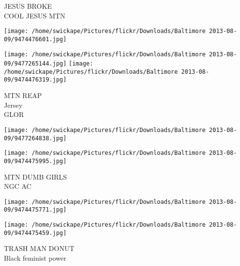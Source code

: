\documentclass[10pt,letterpaper]{article}
\begin{document}
JESUS BROKE\\
COOL JESUS MTN
\pagebreak

\texttt{[image: /home/swickape/Pictures/flickr/Downloads/Baltimore 2013-08-09/9474476601.jpg]}

\vspace{0.25in}
\texttt{[image: /home/swickape/Pictures/flickr/Downloads/Baltimore 2013-08-09/9477265144.jpg]}
\texttt{[image: /home/swickape/Pictures/flickr/Downloads/Baltimore 2013-08-09/9474476319.jpg]}

MTN REAP\\
Jersey\\
GLOR
\pagebreak

\texttt{[image: /home/swickape/Pictures/flickr/Downloads/Baltimore 2013-08-09/9477264838.jpg]}

\vspace{0.25in}
\texttt{[image: /home/swickape/Pictures/flickr/Downloads/Baltimore 2013-08-09/9474475995.jpg]}

MTN DUMB GIRLS\\
NGC AC
\pagebreak

\texttt{[image: /home/swickape/Pictures/flickr/Downloads/Baltimore 2013-08-09/9474475771.jpg]}

\vspace{0.25in}
\texttt{[image: /home/swickape/Pictures/flickr/Downloads/Baltimore 2013-08-09/9474475459.jpg]}

TRASH MAN DONUT\\
Black feminist power
\pagebreak
\end{document}
